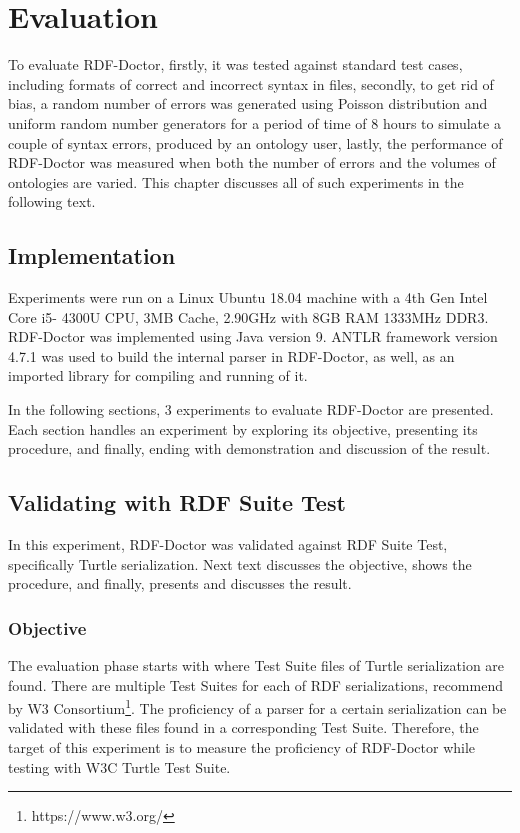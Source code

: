 \chapter{Evaluation}
\label{ch:evaluation}
To evaluate RDF-Doctor, firstly, it was tested against standard test cases, including formats of correct and incorrect syntax in files, secondly, to get rid of bias, a random number of errors was generated using Poisson distribution and uniform random number generators for a period of time of 8 hours to simulate a couple of syntax errors, produced by an ontology user, lastly, the performance of RDF-Doctor was measured when both the number of errors and the volumes of ontologies are varied. This chapter discusses all of such experiments in the following text. 
\section{Implementation}
Experiments were run on a Linux
Ubuntu 18.04 machine with a 4th Gen Intel Core i5-
4300U CPU, 3MB Cache, 2.90GHz with 8GB RAM
1333MHz DDR3. RDF-Doctor was implemented using
Java version 9. ANTLR framework version 4.7.1 was used to build the internal parser in RDF-Doctor, as well, as an imported library for compiling and running of it.  

In the following sections, 3 experiments to evaluate RDF-Doctor are presented. Each section handles an experiment by exploring its objective, presenting its procedure, and finally, ending with demonstration and discussion of the  result.   

\section{Validating with RDF Suite Test} In this experiment, RDF-Doctor was validated against RDF Suite Test, specifically Turtle serialization. Next text discusses the objective, shows the procedure, and finally, presents and discusses the result.     
\subsection{Objective}
The evaluation phase starts with \cite{TurtleTests:Online} where Test Suite files of Turtle serialization are found. There are multiple Test Suites for each of RDF serializations, recommend by W3 Consortium\footnote{https://www.w3.org/}. The proficiency of a parser for a certain serialization can be validated with these files found in a corresponding Test Suite. Therefore, the target of this experiment is to measure the proficiency of RDF-Doctor while testing with W3C Turtle Test Suite.

